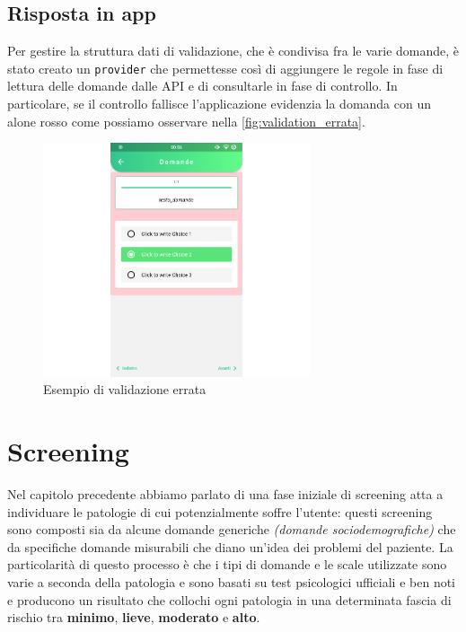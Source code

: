 \subsection{Risposta in app}
Per gestire la struttura dati di validazione, che è condivisa fra le varie domande, è stato creato un \texttt{provider} che permettesse così di aggiungere le regole in fase di lettura delle domande dalle API e di consultarle in fase di controllo. In particolare, se il controllo fallisce l'applicazione evidenzia la domanda con un alone rosso come possiamo osservare nella \autoref{fig:validation_errata}.

\begin{figure}[h!]
\centering
\includegraphics[width=0.7\textwidth]{img/validation_errata}
\caption{Esempio di validazione errata}
\label{fig:validation_errata}
\end{figure}

\newpage
\section{Screening}
Nel capitolo precedente abbiamo parlato di una fase iniziale di screening atta a individuare le patologie di cui potenzialmente soffre l'utente: questi screening sono composti sia da alcune domande generiche \textit{(domande sociodemografiche)} che da specifiche domande misurabili che diano un'idea dei problemi del paziente. La particolarità di questo processo è che i tipi di domande e le scale utilizzate sono varie a seconda della patologia e sono basati su test psicologici ufficiali e ben noti e producono un risultato che collochi ogni patologia in una determinata fascia di rischio tra \textbf{minimo}, \textbf{lieve}, \textbf{moderato} e \textbf{alto}.

